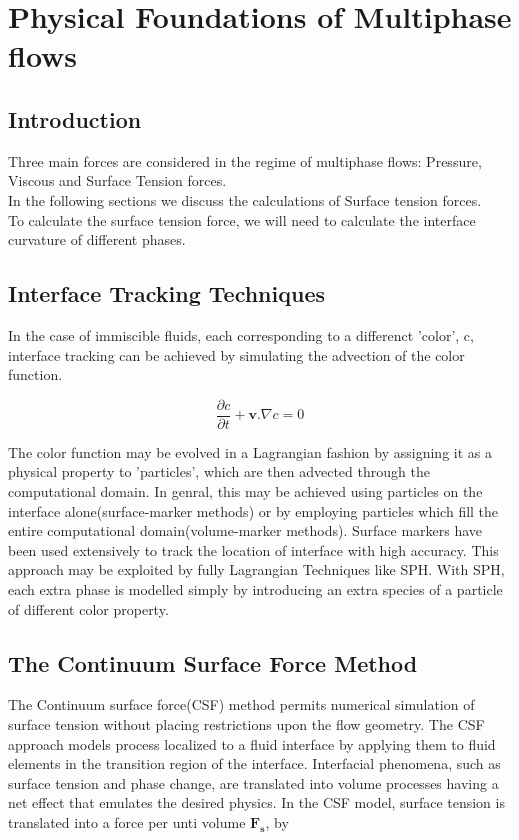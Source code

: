 
\chapter{Physical Foundations of Multiphase flows}

\section{Introduction}
 
Three main forces are considered in the regime of multiphase flows: Pressure, Viscous and Surface Tension forces. \\
\noindent
In the following sections we discuss the calculations of Surface tension forces. \\
\noindent
To calculate the surface tension force, we will need to calculate the interface curvature of different phases.

\section{Interface Tracking Techniques}

In the case of immiscible fluids, each corresponding to a differenct 'color', c, interface tracking can be achieved by simulating the advection of the color function. \cite{Morris}

\begin{equation}
\frac{\partial c}{\partial t} + \mathbf{v}.\nabla c = 0 
\end{equation}

The color function may be evolved in a Lagrangian fashion by assigning it as a physical property to 'particles', which are then advected through the computational domain. In genral, this may be achieved using particles on the interface alone(surface-marker methods) or by employing particles which fill the entire computational domain(volume-marker methods). Surface markers have been used extensively to track the location of interface with high accuracy. This approach may be exploited by fully Lagrangian Techniques like SPH. With SPH, each extra phase is modelled simply by introducing an extra species of a particle of different color property.

\section{The Continuum Surface Force Method}

The Continuum surface force(CSF) method \cite{Brackbill} permits numerical simulation of surface tension without placing restrictions upon the flow geometry. The CSF approach models process localized to a fluid interface by applying them to fluid elements in the transition region of the interface. Interfacial phenomena, such as surface tension and phase change, are translated into volume processes having a net effect that emulates the desired physics.
In the CSF model, surface tension is translated into a force per unti volume $\mathbf{F_s}$, by

